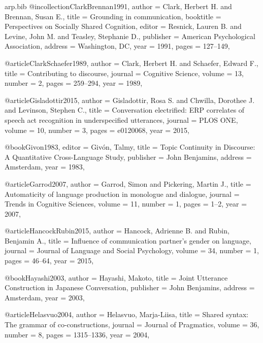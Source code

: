 \begin{filecontents*}[overwrite]{arp.bib}
@incollection{ClarkBrennan1991,
  author    = {Clark, Herbert H. and Brennan, Susan E.},
  title     = {Grounding in communication},
  booktitle = {Perspectives on Socially Shared Cognition},
  editor    = {Resnick, Lauren B. and Levine, John M. and Teasley, Stephanie D.},
  publisher = {American Psychological Association},
  address   = {Washington, DC},
  year      = {1991},
  pages     = {127--149},
}

@article{ClarkSchaefer1989,
  author  = {Clark, Herbert H. and Schaefer, Edward F.},
  title   = {Contributing to discourse},
  journal = {Cognitive Science},
  volume  = {13},
  number  = {2},
  pages   = {259--294},
  year    = {1989},
}

@article{Gisladottir2015,
  author  = {Gisladottir, Rosa S. and Chwilla, Dorothee J. and Levinson, Stephen C.},
  title   = {Conversation electrified: {ERP} correlates of speech act recognition in underspecified utterances},
  journal = {PLOS ONE},
  volume  = {10},
  number  = {3},
  pages   = {e0120068},
  year    = {2015},
}

@book{Givon1983,
  editor    = {Giv{\'o}n, Talmy},
  title     = {Topic Continuity in Discourse: A Quantitative Cross-Language Study},
  publisher = {John Benjamins},
  address   = {Amsterdam},
  year      = {1983},
}

@article{Garrod2007,
  author  = {Garrod, Simon and Pickering, Martin J.},
  title   = {Automaticity of language production in monologue and dialogue},
  journal = {Trends in Cognitive Sciences},
  volume  = {11},
  number  = {1},
  pages   = {1--2},
  year    = {2007},
}

@article{HancockRubin2015,
  author  = {Hancock, Adrienne B. and Rubin, Benjamin A.},
  title   = {Influence of communication partner's gender on language},
  journal = {Journal of Language and Social Psychology},
  volume  = {34},
  number  = {1},
  pages   = {46--64},
  year    = {2015},
}

@book{Hayashi2003,
  author    = {Hayashi, Makoto},
  title     = {Joint Utterance Construction in {Japanese} Conversation},
  publisher = {John Benjamins},
  address   = {Amsterdam},
  year      = {2003},
}

@article{Helasvuo2004,
  author  = {Helasvuo, Marja-Liisa},
  title   = {Shared syntax: The grammar of co-constructions},
  journal = {Journal of Pragmatics},
  volume  = {36},
  number  = {8},
  pages   = {1315--1336},
  year    = {2004},
}


\end{filecontents*}

